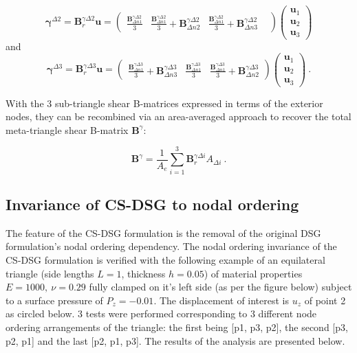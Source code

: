   \begin{equation} 
\boldsymbol{\gamma}^{\Delta 2} =
\mathbf{B}_r^{\gamma\Delta 2}
\mathbf{u}
=
\begin{pmatrix}
\frac{\mathbf{B}_{\Delta n1}^{\gamma\Delta 2}}{3} &
\frac{\mathbf{B}_{\Delta n1}^{\gamma\Delta 2}}{3} + \mathbf{B}_{\Delta n2}^{\gamma\Delta 2} &
\frac{\mathbf{B}_{\Delta n1}^{\gamma\Delta 2}}{3} + \mathbf{B}_{\Delta n3}^{\gamma\Delta 2} &  
\end{pmatrix}
\begin{pmatrix}
\mathbf{u}_1 \\
\mathbf{u}_2 \\
\mathbf{u}_3
\end{pmatrix}
\label{eqCSDSG9}
\end{equation}
and
  \begin{equation} 
\boldsymbol{\gamma}^{\Delta 3} =
\mathbf{B}_r^{\gamma\Delta 3}
\mathbf{u}
=
\begin{pmatrix}
\frac{\mathbf{B}_{\Delta n1}^{\gamma\Delta 3}}{3} + \mathbf{B}_{\Delta n3}^{\gamma\Delta 3} &
\frac{\mathbf{B}_{\Delta n1}^{\gamma\Delta 3}}{3} &
\frac{\mathbf{B}_{\Delta n1}^{\gamma\Delta 3}}{3} + \mathbf{B}_{\Delta n2}^{\gamma\Delta 3}
\end{pmatrix}
\begin{pmatrix}
\mathbf{u}_1 \\
\mathbf{u}_2 \\
\mathbf{u}_3
\end{pmatrix}
\label{eqCSDSG10}\ .
\end{equation}

With the 3 sub-triangle shear B-matrices expressed in terms of the exterior nodes, they can be recombined via an area-averaged approach to recover the total meta-triangle shear B-matrix $\mathbf{B}^{\gamma}$:

\begin{equation} 
\mathbf{B}^{\gamma}
=
\frac{1}{A_e}
\sum_{i=1}^3
\mathbf{B}_r^{\gamma\Delta i}
A_{\Delta i}
\label{eqCSDSG11}\ .
\end{equation}

\subsection{Invariance of CS-DSG to nodal ordering}
The feature of the CS-DSG formulation is the removal of the original DSG formulation's nodal ordering dependency. The nodal ordering invariance of the CS-DSG formulation is verified with the following example of an equilateral triangle (side lengths $L = 1$, thickness $h = 0.05$) of material properties $E = 1000,\ \nu = 0.29$ fully clamped on it's left side (as per the figure below) subject to a surface pressure of $P_z = -0.01$. The displacement of interest is $u_z$ of point 2 as circled below. 3 tests were performed corresponding to 3 different node ordering arrangements of the triangle: the first being [p1, p3, p2], the second [p3, p2, p1] and the last [p2, p1, p3]. The results of the analysis are presented below.

